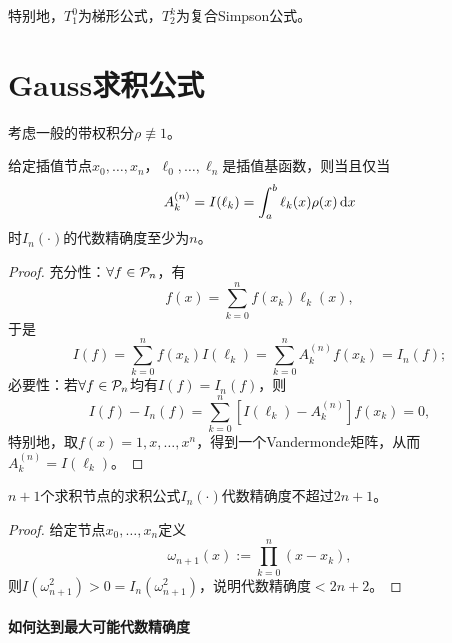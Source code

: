 特别地，$T_1^0$为梯形公式，$T_2^k$为复合Simpson公式。




\section{Gauss求积公式}
\label{sec:Gauss-type quadrature rules}

考虑一般的带权积分$\rho\not\equiv 1$。

\begin{theorem}
    {}{}
    给定插值节点$x_0,\ldots,x_n$，$\ell_0,\ldots,\ell_n$是插值基函数，则当且仅当
    \[
        A_k^{(n)}=I(\ell_k)=\int_a^b\ell_k(x)\rho(x)\mathop{}\!\mathrm{d} x
    \]
    时$I_n(\cdot)$的代数精确度至少为$n$。
\end{theorem}

\begin{proof}
    充分性：$\forall f\in\mathcal P_n$，有 
    \[
        f(x)=\sum_{k=0}^nf(x_k)\ell_k(x),
    \]
    于是
    \[
        I(f)=\sum_{k=0}^nf(x_k)I(\ell_k)=\sum_{k=0}^nA_k^{(n)}f(x_k)=I_n(f);
    \]
    必要性：若$\forall f\in\mathcal P_n$均有$I(f)=I_n(f)$，则
    \[
        I(f)-I_n(f)=\sum_{k=0}^n[I(\ell_k)-A_k^{(n)}]f(x_k)=0,
    \]
    特别地，取$f(x)=1,x,\ldots,x^n$，得到一个Vandermonde矩阵，从而$A_k^{(n)}=I(\ell_k)$。
\end{proof}

\begin{theorem}
    {}{}
    $n+1$个求积节点的求积公式$I_n(\cdot)$代数精确度不超过$2n+1$。
\end{theorem}

\begin{proof}
    给定节点$x_0,\ldots,x_n$定义
    \[
        \omega_{n+1}(x):=\prod_{k=0}^n(x-x_k),
    \]
    则$I(\omega_{n+1}^2)>0=I_n(\omega_{n+1}^2)$，说明代数精确度$<2n+2$。
\end{proof}

\paragraph{如何达到最大可能代数精确度}

